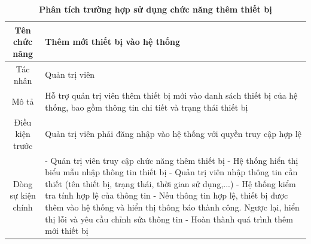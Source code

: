 \begin{table}[H]
	\caption{\bfseries \fontsize{12pt}{0pt}\selectfont Phân tích trường hợp sử dụng chức năng thêm thiết bị}
	\centering
	\begin{tabularx}{0.9\textwidth}{|c|X|}
		\hline
		\textbf{Tên chức năng} & \textbf{Thêm mới thiết bị vào hệ thống}                                                                                       \\
		\hline
		Tác nhân               & Quản trị viên                                                                                                                 \\
		\hline
		Mô tả                  & Hỗ trợ quản trị viên thêm thiết bị mới vào danh sách thiết bị của hệ thống, bao gồm thông tin chi tiết và trạng thái thiết bị \\
		\hline
		Điều kiện trước        & Quản trị viên phải đăng nhập vào hệ thống với quyền truy cập hợp lệ                                                           \\
		\hline
		Dòng sự kiện chính     &
		- Quản trị viên truy cập chức năng thêm thiết bị \newline
		- Hệ thống hiển thị biểu mẫu nhập thông tin thiết bị \newline
		- Quản trị viên nhập thông tin cần thiết (tên thiết bị, trạng thái, thời gian sử dụng,...) \newline
		- Hệ thống kiểm tra tính hợp lệ của thông tin \newline
		- Nếu thông tin hợp lệ, thiết bị được thêm vào hệ thống và hiển thị thông báo thành công. Ngược lại, hiển thị lỗi và yêu cầu chỉnh sửa thông tin \newline
		- Hoàn thành quá trình thêm mới thiết bị                                                                                                               \\
		\hline
	\end{tabularx}
\end{table}

